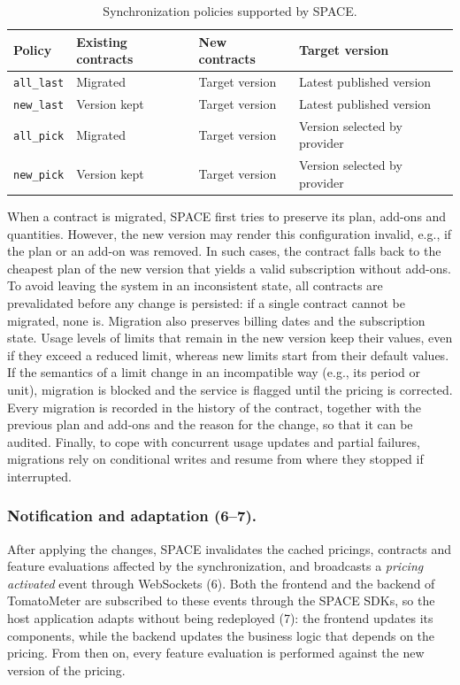 \begin{table}[t]
  \centering
  \caption{Synchronization policies supported by SPACE.}
  \label{tab:policies}
  \begin{tabular}{llll}
    \toprule
    \textbf{Policy} & \textbf{Existing contracts} & \textbf{New contracts} & \textbf{Target version} \\
    \midrule
    \texttt{all\_last} & Migrated & Target version & Latest published version \\
    \texttt{new\_last} & Version kept & Target version & Latest published version \\
    \texttt{all\_pick} & Migrated & Target version & Version selected by provider \\
    \texttt{new\_pick} & Version kept & Target version & Version selected by provider \\
    \bottomrule
  \end{tabular}
\end{table}

When a contract is migrated, SPACE first tries to preserve its plan, add-ons and quantities. However, the new version may render this configuration invalid, e.g., if the plan or an add-on was removed. In such cases, the contract falls back to the cheapest plan of the new version that yields a valid subscription without add-ons. To avoid leaving the system in an inconsistent state, all contracts are prevalidated before any change is persisted: if a single contract cannot be migrated, none is. Migration also preserves billing dates and the subscription state. Usage levels of limits that remain in the new version keep their values, even if they exceed a reduced limit, whereas new limits start from their default values. If the semantics of a limit change in an incompatible way (e.g., its period or unit), migration is blocked and the service is flagged until the pricing is corrected. Every migration is recorded in the history of the contract, together with the previous plan and add-ons and the reason for the change, so that it can be audited. Finally, to cope with concurrent usage updates and partial failures, migrations rely on conditional writes and resume from where they stopped if interrupted.

\subsubsection{Notification and adaptation (6--7).}
After applying the changes, SPACE invalidates the cached pricings, contracts and feature evaluations affected by the synchronization, and broadcasts a \emph{pricing activated} event through WebSockets (6). Both the frontend and the backend of TomatoMeter are subscribed to these events through the SPACE SDKs, so the host application adapts without being redeployed (7): the frontend updates its components, while the backend updates the business logic that depends on the pricing. From then on, every feature evaluation is performed against the new version of the pricing.

